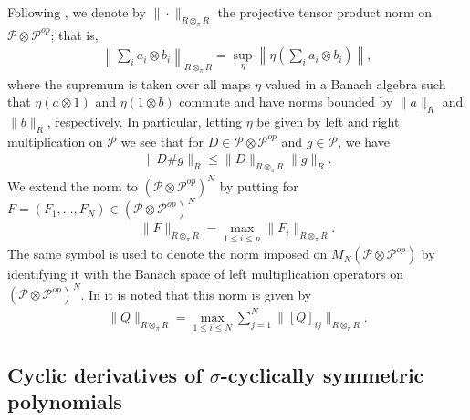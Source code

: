 Following \cite{GS14}, we denote by $\|\cdot\|_{R\otimes_\pi R}$ the projective tensor product norm on $\mathscr{P}\otimes \mathscr{P}^{op}$; that is,
	\begin{align*}
		\left\| \sum_i a_i\otimes b_i \right\|_{R\otimes_\pi R} = \sup_{\eta} \left\| \eta\left(\sum_i a_i\otimes b_i\right)\right\|,
	\end{align*}
where the supremum is taken over all maps $\eta$ valued in a Banach algebra such that $\eta(a\otimes 1)$ and $\eta(1\otimes b)$ commute and have norms bounded by $\|a\|_R$ and $\|b\|_R$, respectively. In particular, letting $\eta$ be given by left and right multiplication on $\mathscr{P}$ we see that for $D\in \mathscr{P}\otimes\mathscr{P}^{op}$ and $g\in\mathscr{P}$, we have
	\begin{align*}
		\| D\# g\|_R \leq \|D\|_{R\otimes_\pi R} \|g\|_R.
	\end{align*}
We extend the norm to $\left(\mathscr{P}\otimes\mathscr{P}^{op}\right)^N$ by putting for $F=(F_1,\ldots, F_N)\in \left(\mathscr{P}\otimes\mathscr{P}^{op}\right)^N$
	\begin{align*}
		\|F\|_{R\otimes_\pi R} = \max_{1\leq i \leq n} \|F_i\|_{R\otimes_\pi R}.
	\end{align*}
The same symbol is used to denote the norm imposed on $M_N(\mathscr{P}\otimes\mathscr{P}^{op})$ by identifying it with the Banach space of left multiplication operators on $\left(\mathscr{P}\otimes\mathscr{P}^{op}\right)^N$. In \cite{GS14} it is noted that this norm is given by
	\begin{align*}
		\| Q\|_{R\otimes_\pi R} = \max_{1\leq i\leq N} \sum_{j=1}^N \| [Q]_{ij}\|_{R\otimes_\pi R}.
	\end{align*}


\subsection{Cyclic derivatives of $\sigma$-cyclically symmetric polynomials}


